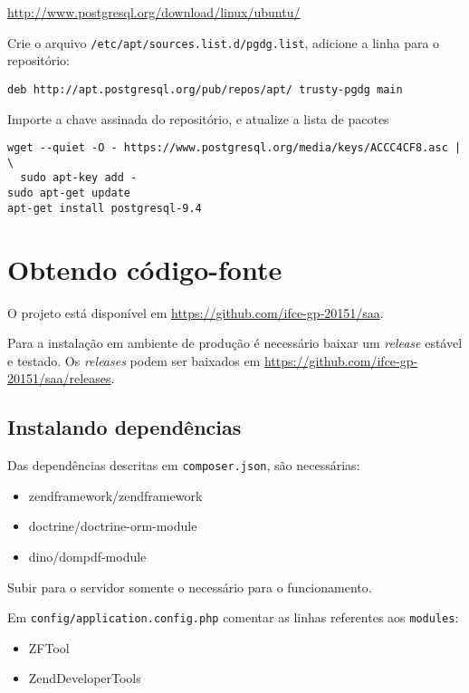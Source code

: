 \url{http://www.postgresql.org/download/linux/ubuntu/}

Crie o arquivo \texttt{/etc/apt/sources.list.d/pgdg.list}, adicione a
linha para o repositório:

\begin{verbatim}
deb http://apt.postgresql.org/pub/repos/apt/ trusty-pgdg main
\end{verbatim}

Importe a chave assinada do repositório, e atualize a lista de pacotes

\begin{verbatim}
wget --quiet -O - https://www.postgresql.org/media/keys/ACCC4CF8.asc | \
  sudo apt-key add -
sudo apt-get update
apt-get install postgresql-9.4
\end{verbatim}

\section{Obtendo código-fonte}\label{obtendo-cuxf3digo-fonte}

O projeto está disponível em \url{https://github.com/ifce-gp-20151/saa}.

Para a instalação em ambiente de produção é necessário baixar um
\emph{release} estável e testado. Os \emph{releases} podem ser baixados
em \url{https://github.com/ifce-gp-20151/saa/releases}.

\subsection{Instalando dependências}\label{instalando-dependuxeancias}

Das dependências descritas em \texttt{composer.json}, são necessárias:

\begin{itemize}
\itemsep1pt\parskip0pt
\item
  zendframework/zendframework
\item
  doctrine/doctrine-orm-module
\item
  dino/dompdf-module
\end{itemize}

Subir para o servidor somente o necessário para o funcionamento.

Em \texttt{config/application.config.php} comentar as linhas referentes
aos \texttt{modules}:

\begin{itemize}
\itemsep1pt\parskip0pt
\item
  ZFTool
\item
  ZendDeveloperTools
\end{itemize}

